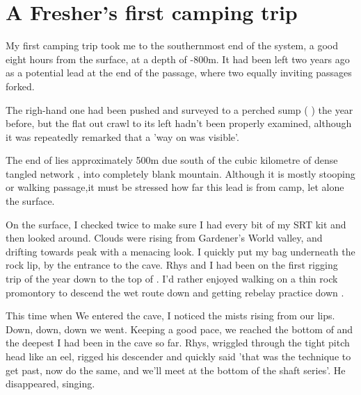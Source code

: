 \section{ A Fresher's first camping trip}

\begin{marginfigure}
\end{marginfigure}

My first camping trip took me to the southernmost end of the system, a good eight hours from the surface, at a depth of -800m. It had been left two years ago as a potential lead at the end of the  passage, where two equally inviting passages forked. 


The righ-hand one had been pushed and surveyed to a perched sump (  ) the year before, but the flat out crawl to its left hadn't been properly examined, although it was repeatedly remarked that a 'way on was visible'. 

The end of  lies approximately 500m due south of the cubic kilometre of dense tangled network , into completely blank mountain. Although it is mostly stooping or walking passage,it must be stressed how far this lead is from camp, let alone the surface.

On the surface, I checked twice to make sure I had every bit of my SRT kit and then looked around. Clouds were rising from Gardener's World valley, and drifting towards  peak with a menacing look. I quickly put my bag underneath the rock lip, by the entrance to the cave. Rhys and I had been on the first rigging trip of the year down to the top of . I'd rather enjoyed walking on a thin rock promontory to descend the wet route down  and getting rebelay practice down .

This time when We entered the cave, I noticed the mists rising from our lips. Down, down, down we went. Keeping a good pace, we reached the bottom of  and the deepest I had been in the cave so far. Rhys, wriggled through the tight  pitch head like an eel, rigged his descender and quickly said 'that was the technique to get past, now do the same, and we'll meet at the bottom of the shaft series'. He disappeared, singing.

